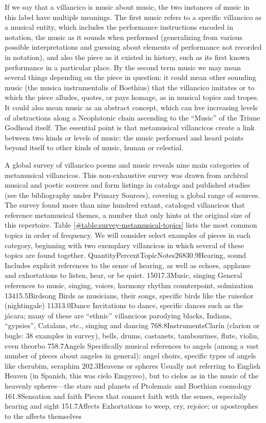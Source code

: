 \documentclass{memoir}
\begin{document}
{{{      If we say that a villancico is music about music, the two instances of music in this label have multiple meanings.
      The first music refers to a specific villancico as a musical entity, which includes the performance instructions encoded in notation, the music as it sounds when performed (generalizing from various possible interpretations and guessing about elements of performance not recorded in notation), and also the piece as it existed in history, such as its first known performance in a particular place.
      By the second term music we may mean several things depending on the piece in question: it could mean other sounding music (the musica instrumentalis of Boethius) that the villancico imitates or to which the piece alludes, quotes, or pays homage, as in musical topics and tropes.
      It could also mean music as an abstract concept, which can hve increasing levels of abstractions along a Neoplatonic chain ascending to the \enquote{Music} of the Triune Godhead itself.
      The essential point is that metamusical villancicos create a link between two kinds or levels of music: the music performed and heard points beyond itself to other kinds of music, human or celestial.
    
      A global survey of villancico poems and music reveals nine main categories of metamusical villancicos.
      This non-exhaustive survey was drawn from archival musical and poetic sources and form listings in catalogs and published studies (see the bibliography under Primary Sources), covering a global range of sources.
      The survey found more than nine hundred extant, cataloged villancicos that reference metamusical themes, a number that only hints at the original size of this repertoire.
      Table \ref{#table:survey-metamusical-topics} lists the most common topics in order of frequency.
      We will consider select examples of pieces in each category, beginning with two exemplary villancicos in which several of these topics are found together.
    QuantityPercentTopicNotes26830.9Hearing, sound
	  Includes explicit references to the sense of hearing, as well as echoes, applause and exhortations to listen, hear, or be quiet.
	15017.3Music, singing
	  General references to music, singing, voices, harmony rhythm counterpoint, solmization
	13415.5Birdsong
	  Birds as musicians, their songs, specific birds like the ruiseñor (nightingale)
	11313.0Dance
	  Invitations to dance, specific dances such as the jácara; many of these are \enquote{ethnic} villancicos parodying blacks, Indians, \enquote{gypsies}, Catalans, etc., singing and dancing
	768.8InstrumentsClarín (clarion or bugle: 38 examples in survey), bells, drums, castanets, tambourines, flute, violin, even theorbo
	758.7Angels
	  Specifically musical references to angels (among a vast number of pieces about angeles in general): angel choirs, specific types of angels like cherubim, seraphim
	202.3Heavens or spheres
	  Usually not referring to English Heaven (in Spanish, this was cielo Empyreo), but to cielos as in the music of the heavenly spheres—the stars and planets of Ptolemaic and Boethian cosmology
	161.8Sensation and faith
	  Pieces that connect faith with the senses, especially hearing and sight
	151.7Affects
	  Exhortations to weep, cry, rejoice; or apostrophes to the affects themselves
	
}}}
\end{document}
